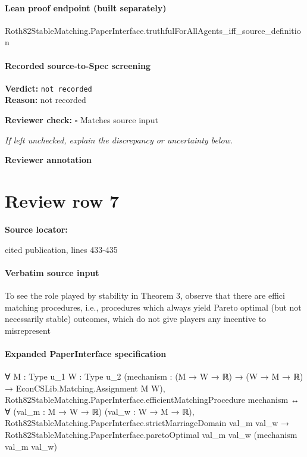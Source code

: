 \documentclass[10pt]{article}
\newcommand{\reviewerbox}{%
  \par\noindent\fbox{\parbox{0.96\linewidth}{\rule{0pt}{0.38in}}}\par
}
\newcommand{\reviewmatch}[1]{%
  \par\noindent\textbf{Reviewer check:} $\square$\; #1\par
  \noindent\emph{If left unchecked, explain the discrepancy or uncertainty below.}\par
}
\begin{document}
\paragraph{Lean proof endpoint (built separately)}\begin{ReviewVerbatim}
Roth82StableMatching.PaperInterface.truthfulForAllAgents_iff_source_definition
\end{ReviewVerbatim}

\paragraph{Recorded source-to-Spec screening}
\textbf{Verdict:} \texttt{not recorded}
\\
\textbf{Reason:} not recorded
\reviewmatch{Matches source input}
\noindent\textbf{Reviewer annotation}\par
\reviewerbox
\clearpage
\hypertarget{source-claim-c58c00f4b4ad6e83}{}
\section*{Review row 7}
\textbf{Source locator:} {\footnotesize\raggedright cited publication, lines 433-\allowbreak{}435\par}
\paragraph{Verbatim source input}
\begin{ReviewVerbatim}
To see the role played by stability in Theorem 3, observe that there are effici
matching procedures, i.e., procedures which always yield Pareto optimal (but not
necessarily stable) outcomes, which do not give players any incentive to misrepresent
\end{ReviewVerbatim}


\paragraph{Expanded PaperInterface specification}
\begin{ReviewVerbatim}
∀ {M : Type u_1} {W : Type u_2} (mechanism : (M → W → ℝ) → (W → M → ℝ) → EconCSLib.Matching.Assignment M W),
  Roth82StableMatching.PaperInterface.efficientMatchingProcedure mechanism ↔
    ∀ (val_m : M → W → ℝ) (val_w : W → M → ℝ),
      Roth82StableMatching.PaperInterface.strictMarriageDomain val_m val_w →
        Roth82StableMatching.PaperInterface.paretoOptimal val_m val_w (mechanism val_m val_w)
\end{ReviewVerbatim}
\end{document}
